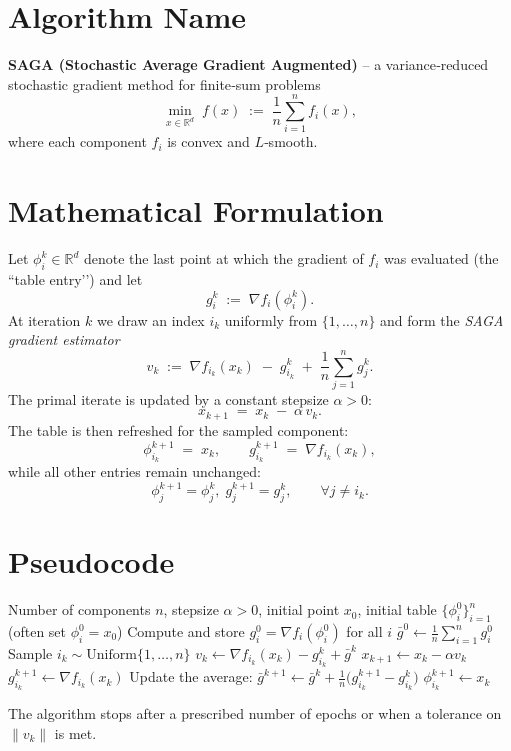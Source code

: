 \documentclass{article}
\begin{document}
\section*{Algorithm Name}
\textbf{SAGA (Stochastic Average Gradient Augmented)} – a variance‑reduced stochastic gradient method for finite‑sum problems
\[
\min_{x\in\mathbb{R}^d}\; f(x)\;:=\;\frac{1}{n}\sum_{i=1}^{n} f_i(x),
\]
where each component $f_i$ is convex and $L$‑smooth.

\section*{Mathematical Formulation}
Let $\phi_i^k\in\mathbb{R}^d$ denote the last point at which the gradient of $f_i$ was evaluated (the “table entry’’) and let
\[
g_i^k \;:=\; \nabla f_i(\phi_i^k).
\]
At iteration $k$ we draw an index $i_k$ uniformly from $\{1,\dots,n\}$ and form the \emph{SAGA gradient estimator}
\begin{equation}
v_k \;:=\; \nabla f_{i_k}(x_k) \;-\; g_{i_k}^k \;+\; \frac{1}{n}\sum_{j=1}^{n} g_j^k . \tag{1}
\end{equation}
The primal iterate is updated by a constant stepsize $\alpha>0$:
\begin{equation}
x_{k+1}\;=\;x_k \;-\; \alpha\, v_k . \tag{2}
\end{equation}
The table is then refreshed for the sampled component:
\begin{equation}
\phi_{i_k}^{k+1}\;=\;x_k,\qquad 
g_{i_k}^{k+1}\;=\;\nabla f_{i_k}(x_k), \tag{3}
\end{equation}
while all other entries remain unchanged:
\[
\phi_j^{k+1}= \phi_j^{k},\; g_j^{k+1}=g_j^{k},\qquad \forall j\neq i_k .
\]

\section*{Pseudocode}
\begin{algorithm}[H]
\caption{SAGA}
\begin{algorithmic}[1]
\Require Number of components $n$, stepsize $\alpha>0$, initial point $x_0$, initial table $\{\phi_i^0\}_{i=1}^n$ (often set $\phi_i^0=x_0$)
\State Compute and store $g_i^0=\nabla f_i(\phi_i^0)$ for all $i$
\State $\displaystyle \bar g^0 \gets \frac{1}{n}\sum_{i=1}^n g_i^0$
    \State Sample $i_k\sim \text{Uniform}\{1,\dots,n\}$
    \State $v_k \gets \nabla f_{i_k}(x_k) - g_{i_k}^k + \bar g^k$   
    \State $x_{k+1} \gets x_k - \alpha v_k$                       
    \State $g_{i_k}^{k+1} \gets \nabla f_{i_k}(x_k)$
    \State Update the average:
          $\displaystyle \bar g^{k+1}\gets \bar g^{k}
               +\frac{1}{n}\bigl(g_{i_k}^{k+1}-g_{i_k}^{k}\bigr)$
    \State $\phi_{i_k}^{k+1}\gets x_k$
\EndFor
\end{algorithmic}
\end{algorithm}
The algorithm stops after a prescribed number of epochs or when a tolerance on $\|v_k\|$ is met.
\end{document}
